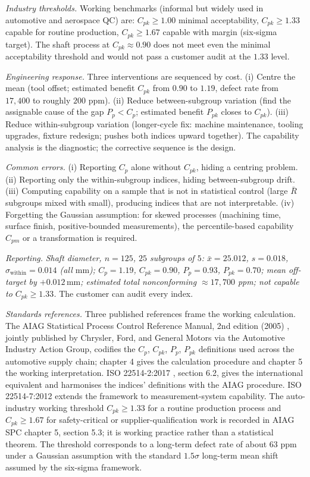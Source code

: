 \textit{Industry thresholds.} Working benchmarks (informal but
widely used in automotive and aerospace QC) are:
$C_{pk} \geq 1.00$ minimal acceptability,
$C_{pk} \geq 1.33$ capable for routine production,
$C_{pk} \geq 1.67$ capable with margin (six-sigma target).
The shaft process at $C_{pk} \approx 0.90$ does not meet even the
minimal acceptability threshold and would not pass a customer
audit at the $1.33$ level.

\textit{Engineering response.} Three interventions are sequenced
by cost. (i) Centre the mean (tool offset; estimated benefit
$C_{pk}$ from $0.90$ to $1.19$, defect rate from $17{,}400$ to
roughly $200$ ppm). (ii) Reduce between-subgroup variation (find
the assignable cause of the gap $P_{p} < C_{p}$; estimated benefit
$P_{pk}$ closes to $C_{pk}$). (iii) Reduce within-subgroup
variation (longer-cycle fix: machine maintenance, tooling
upgrades, fixture redesign; pushes both indices upward together).
The capability analysis is the diagnostic; the corrective sequence
is the design.

\textit{Common errors.} (i) Reporting $C_{p}$ alone without
$C_{pk}$, hiding a centring problem. (ii) Reporting only the
within-subgroup indices, hiding between-subgroup drift.
(iii) Computing capability on a sample that is not in statistical
control (large $\bar{R}$ subgroups mixed with small), producing
indices that are not interpretable. (iv) Forgetting the Gaussian
assumption: for skewed processes (machining time, surface finish,
positive-bounded measurements), the percentile-based capability
$C_{pm}$ or a transformation is required.

\textit{Reporting.} \emph{Shaft diameter, $n = 125$, $25$ subgroups
of $5$: $\bar{x} = 25.012$, $s = 0.018$, $\hat{\sigma}_{\text{within}}
= 0.014$ (all $\si{\milli\meter}$); $C_{p} = 1.19$, $C_{pk} = 0.90$,
$P_{p} = 0.93$, $P_{pk} = 0.70$; mean off-target by $+0.012
\,\si{\milli\meter}$; estimated total nonconforming $\approx 17{,}700$
ppm; not capable to $C_{pk} \geq 1.33$.} The customer can audit
every index.

\textit{Standards references.} Three published references frame
the working calculation. The AIAG Statistical Process Control
Reference Manual, 2nd edition (2005)
\cite{std:ch08t3b-aiag-spc-2005}, jointly published by Chrysler,
Ford, and General Motors via the Automotive Industry Action Group,
codifies the $C_{p}$, $C_{pk}$, $P_{p}$, $P_{pk}$ definitions used
across the automotive supply chain; chapter 4 gives the
calculation procedure and chapter 5 the working interpretation.
ISO 22514-2:2017
\cite{std:ch08-iso-22514-2-2017}, section 6.2, gives the
international equivalent and harmonises the indices' definitions
with the AIAG procedure. ISO 22514-7:2012 extends the framework
to measurement-system capability. The auto-industry working
threshold $C_{pk} \geq 1.33$ for a routine production process and
$C_{pk} \geq 1.67$ for safety-critical or supplier-qualification
work is recorded in AIAG SPC chapter 5, section 5.3; it is
working practice rather than a statistical theorem. The threshold
corresponds to a long-term defect rate of about $63$ ppm under a
Gaussian assumption with the standard $1.5\sigma$ long-term mean
shift assumed by the six-sigma framework.

